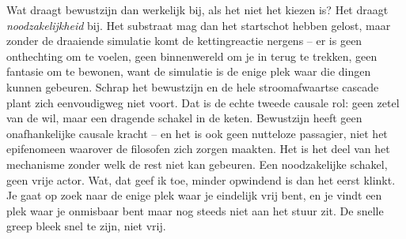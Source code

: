 \documentclass[11pt, twoside, openright]{book}
\begin{document}
Wat draagt bewustzijn dan werkelijk bij, als het niet het kiezen is? Het draagt \textit{noodzakelijkheid} bij. Het substraat mag dan het startschot hebben gelost, maar zonder de draaiende simulatie komt de kettingreactie nergens -- er is geen onthechting om te voelen, geen binnenwereld om je in terug te trekken, geen fantasie om te bewonen, want de simulatie is de enige plek waar die dingen kunnen gebeuren. Schrap het bewustzijn en de hele stroomafwaartse cascade plant zich eenvoudigweg niet voort. Dat is de echte tweede causale rol: geen zetel van de wil, maar een dragende schakel in de keten. Bewustzijn heeft geen onafhankelijke causale kracht -- en het is ook geen nutteloze passagier, niet het epifenomeen waarover de filosofen zich zorgen maakten. Het is het deel van het mechanisme zonder welk de rest niet kan gebeuren. Een noodzakelijke schakel, geen vrije actor. Wat, dat geef ik toe, minder opwindend is dan het eerst klinkt. Je gaat op zoek naar de enige plek waar je eindelijk vrij bent, en je vindt een plek waar je onmisbaar bent maar nog steeds niet aan het stuur zit. De snelle greep bleek snel te zijn, niet vrij.
\end{document}
